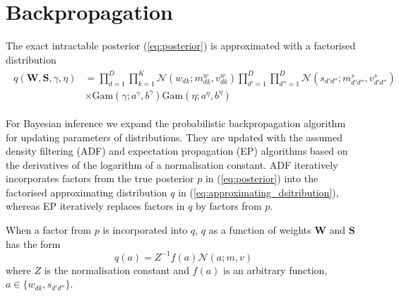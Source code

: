 \documentclass{article}
\begin{document}
  
  
  
  \section{Backpropagation}
  \label{sec:backpropagation}
  
  The exact intractable posterior (\ref{eq:posterior}) is approximated with a factorised distribution
  \begin{align}
  \label{eq:approximating_dsitribution}
  \begin{split}
  q(\mathbf{W}, \mathbf{S}, \gamma, \eta) &= \prod_{d=1}^D\prod_{k=1}^K \mathcal{N}(w_{dk} ; m^w_{dk}, v^w_{dk}) \prod_{d'=1}^D\prod_{d''=1}^D \mathcal{N}(s_{d'd''} ; m^s_{d'd''}, v^s_{d'd''}) \\
  &\times \text{Gam}(\gamma; a^\gamma, b^\gamma) \text{Gam}(\eta; a^\eta, b^\eta)
  \end{split}
  \end{align}
  
  For Bayesian inference we expand the probabilistic backpropagation algorithm~\cite{hernandez2015probabilistic} for updating parameters of distributions. They are updated with the assumed density filtering (ADF) and expectation propagation (EP) algorithms based on the derivatives of the logarithm of a normalisation constant. ADF iteratively incorporates factors from the true posterior $p$ in (\ref{eq:posterior}) into the factorised approximating distribution $q$ in (\ref{eq:approximating_dsitribution}), whereas EP iteratively replaces factors in $q$ by factors from $p$.
  
  When a factor from $p$ is incorporated into $q$, $q$ as a function of weights $\mathbf{W}$ and $\mathbf{S}$ has the form
  \begin{equation}
  q(a) = Z^{-1}f(a)\mathcal{N}(a; m, v)
  \end{equation}
  where $Z$ is the normalisation constant and $f(a)$ is an arbitrary function, $a \in \{w_{dk}, s_{d'd''}\}$.
  
\end{document}
